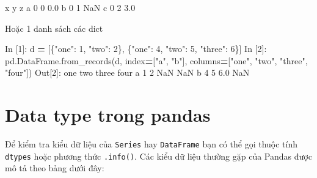 \documentclass[
]{book}
\newenvironment{Shaded}{\begin{snugshade}}{\end{snugshade}}
\newcommand{\DecValTok}[1]{\textcolor[rgb]{0.00,0.00,0.81}{#1}}
\newcommand{\FloatTok}[1]{\textcolor[rgb]{0.00,0.00,0.81}{#1}}
\newcommand{\NormalTok}[1]{#1}
\newcommand{\OperatorTok}[1]{\textcolor[rgb]{0.81,0.36,0.00}{\textbf{#1}}}
\newcommand{\StringTok}[1]{\textcolor[rgb]{0.31,0.60,0.02}{#1}}
\begin{document}
\begin{Shaded}
\begin{Highlighting}[]
\NormalTok{   x  y    z}
\NormalTok{a  }\DecValTok{0}  \DecValTok{0}  \FloatTok{0.0}
\NormalTok{b  }\DecValTok{0}  \DecValTok{1}\NormalTok{  NaN}
\NormalTok{c  }\DecValTok{0}  \DecValTok{2}  \FloatTok{3.0}
\end{Highlighting}
\end{Shaded}

Hoặc 1 danh sách các dict

\begin{Shaded}
\begin{Highlighting}[]
\NormalTok{In [}\DecValTok{1}\NormalTok{]: d }\OperatorTok{=}\NormalTok{ [\{}\StringTok{"one"}\NormalTok{: }\DecValTok{1}\NormalTok{, }\StringTok{"two"}\NormalTok{: }\DecValTok{2}\NormalTok{\}, \{}\StringTok{"one"}\NormalTok{: }\DecValTok{4}\NormalTok{, }\StringTok{"two"}\NormalTok{: }\DecValTok{5}\NormalTok{, }\StringTok{"three"}\NormalTok{: }\DecValTok{6}\NormalTok{\}]}
\NormalTok{In [}\DecValTok{2}\NormalTok{]: pd.DataFrame.from\_records(d, index}\OperatorTok{=}\NormalTok{[}\StringTok{"a"}\NormalTok{, }\StringTok{"b"}\NormalTok{], columns}\OperatorTok{=}\NormalTok{[}\StringTok{"one"}\NormalTok{, }\StringTok{"two"}\NormalTok{, }\StringTok{"three"}\NormalTok{, }\StringTok{"four"}\NormalTok{])}
\NormalTok{Out[}\DecValTok{2}\NormalTok{]:}
\NormalTok{   one  two  three  four}
\NormalTok{a    }\DecValTok{1}    \DecValTok{2}\NormalTok{    NaN   NaN}
\NormalTok{b    }\DecValTok{4}    \DecValTok{5}    \FloatTok{6.0}\NormalTok{   NaN}
\end{Highlighting}
\end{Shaded}

\section{Data type trong pandas}\label{data-type-trong-pandas}

Để kiểm tra kiểu dữ liệu của \texttt{Series} hay \texttt{DataFrame} bạn có thể gọi thuộc tính \texttt{dtypes} hoặc phương thức \texttt{.info()}.
Các kiểu dữ liệu thường gặp của Pandas được mô tả theo bảng dưới đây:
\end{document}
